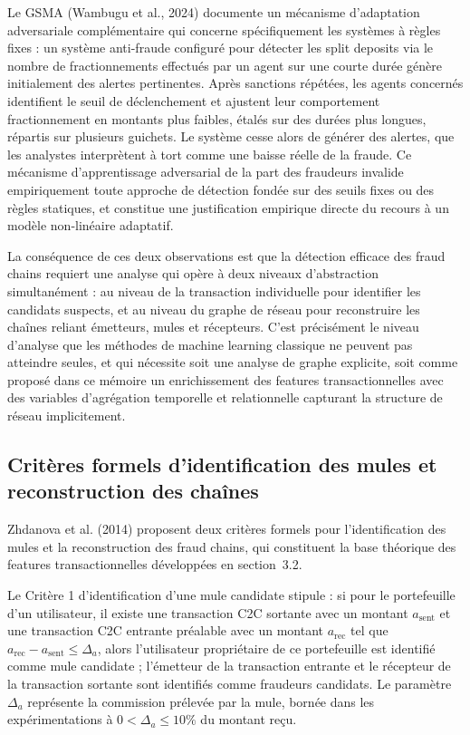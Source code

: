 \documentclass[11pt,a4paper,oneside]{report}
\theoremstyle{definition}
\theoremstyle{remark}
\begin{document}
Le GSMA (Wambugu et al., 2024) documente un mécanisme d'adaptation adversariale complémentaire qui concerne spécifiquement les systèmes à règles fixes : un système anti-fraude configuré pour détecter les split deposits via le nombre de fractionnements effectués par un agent sur une courte durée génère initialement des alertes pertinentes. Après sanctions répétées, les agents concernés identifient le seuil de déclenchement et ajustent leur comportement  fractionnement en montants plus faibles, étalés sur des durées plus longues, répartis sur plusieurs guichets. Le système cesse alors de générer des alertes, que les analystes interprètent à tort comme une baisse réelle de la fraude. Ce mécanisme d'apprentissage adversarial de la part des fraudeurs invalide empiriquement toute approche de détection fondée sur des seuils fixes ou des règles statiques, et constitue une justification empirique directe du recours à un modèle non-linéaire adaptatif.

La conséquence de ces deux observations est que la détection efficace des fraud chains requiert une analyse qui opère à deux niveaux d'abstraction simultanément : au niveau de la transaction individuelle pour identifier les candidats suspects, et au niveau du graphe de réseau pour reconstruire les chaînes reliant émetteurs, mules et récepteurs. C'est précisément le niveau d'analyse que les méthodes de machine learning classique ne peuvent pas atteindre seules, et qui nécessite soit une analyse de graphe explicite, soit  comme proposé dans ce mémoire  un enrichissement des features transactionnelles avec des variables d'agrégation temporelle et relationnelle capturant la structure de réseau implicitement.

\subsection{Critères formels d'identification des mules et reconstruction des chaînes}

Zhdanova et al. (2014) proposent deux critères formels pour l'identification des mules et la reconstruction des fraud chains, qui constituent la base théorique des features transactionnelles développées en section~3.2.

Le Critère 1 d'identification d'une mule candidate stipule : si pour le portefeuille d'un utilisateur, il existe une transaction C2C sortante avec un montant $a_{\text{sent}}$ et une transaction C2C entrante préalable avec un montant $a_{\text{rec}}$ tel que $a_{\text{rec}} - a_{\text{sent}} \leq \Delta_a$, alors l'utilisateur propriétaire de ce portefeuille est identifié comme mule candidate ; l'émetteur de la transaction entrante et le récepteur de la transaction sortante sont identifiés comme fraudeurs candidats. Le paramètre $\Delta_a$ représente la commission prélevée par la mule, bornée dans les expérimentations à $0 < \Delta_a \leq 10\%$ du montant reçu.
\end{document}
